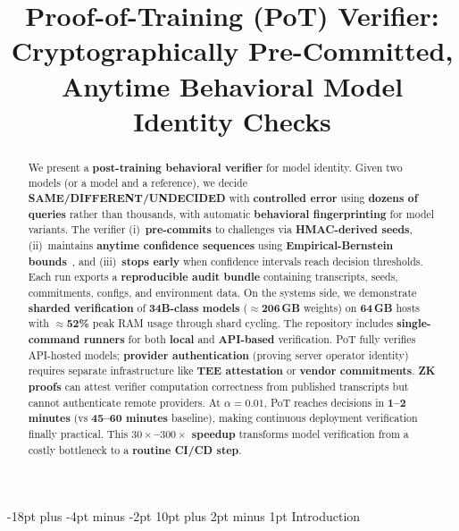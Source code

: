 \documentclass[11pt]{article}
\title{Proof-of-Training (PoT) Verifier: Cryptographically Pre-Committed,\\
Anytime Behavioral Model Identity Checks}
\date{}
\makeatletter
\renewcommand\section{\@startsection{section}{1}{\z@}%
  {-18pt plus -4pt minus -2pt}%
  {10pt plus 2pt minus 1pt}%
  {\normalfont\Large\bfseries}}
\makeatother
\begin{document}
\makeatletter
\renewcommand{\@listI}{%
  \setlength{\topsep}{6pt}%
  \setlength{\itemsep}{3pt}%
  \setlength{\parsep}{0pt}%
  \setlength{\partopsep}{0pt}%
}
\makeatother

\maketitle

\begin{abstract}
We present a \textbf{post-training behavioral verifier} for model identity. 
Given two models (or a model and a reference), we decide 
\textbf{SAME/DIFFERENT/UNDECIDED} with \textbf{controlled error} using 
\textbf{dozens of queries} rather than thousands, with automatic 
\textbf{behavioral fingerprinting} for model variants. 
The verifier (i)~\textbf{pre-commits} to challenges via \textbf{HMAC-derived seeds}, 
(ii)~maintains \textbf{anytime confidence sequences} using 
\textbf{Empirical-Bernstein bounds}~\cite{maurer2009empiricalbernstein,howard2021timeuniform,howard2021confidenceSequences}, 
and (iii)~\textbf{stops early} when confidence intervals reach decision thresholds. 
Each run exports a \textbf{reproducible audit bundle} containing transcripts, 
seeds, commitments, configs, and environment data. 
On the systems side, we demonstrate \textbf{sharded verification} of 
\textbf{34B-class models} ($\approx$\textbf{206\,GB} weights) on \textbf{64\,GB} hosts 
with $\approx$\textbf{52\%} peak RAM usage through shard cycling. 
The repository includes \textbf{single-command runners} for both \textbf{local} 
and \textbf{API-based} verification. 
PoT fully verifies API-hosted models; \textbf{provider authentication} 
(proving server operator identity) requires separate infrastructure like 
\textbf{TEE attestation} or \textbf{vendor commitments}. 
\textbf{ZK proofs} can attest verifier computation correctness from published 
transcripts but cannot authenticate remote providers. 
At $\alpha=0.01$, PoT reaches decisions in \textbf{1--2 minutes} (vs \textbf{45--60 minutes} baseline), 
making continuous deployment verification finally practical. This \textbf{$30{\times}$--$300{\times}$ speedup} 
transforms model verification from a costly bottleneck to a \textbf{routine CI/CD step}.
\end{abstract}

\section{Introduction}
\end{document}

